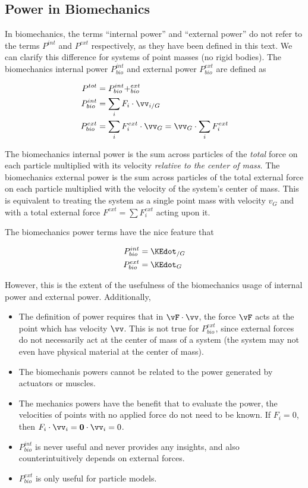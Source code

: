 \subsection*{Power in Biomechanics}
\label{sec:Power in Biomechanics}

In biomechanics, the terms ``internal power'' and ``external power'' do not refer to the terms $P^{int}$ and $P^{ext}$ respectively, as they have been defined in this text. We can clarify this difference for systems of point masses (no rigid bodies). The biomechanics internal power $P_{bio}^{int}$ and external power $P_{bio}^{ext}$ are defined as

\begin{align}
P^{tot} &= P_{bio}^{int} + _{bio}^{ext} \\
P_{bio}^{int} &= \sum_{i} F_{i} \cdot \vv_{i/G} \\
P_{bio}^{ext} &= \sum_{i} F_{i}^{ext} \cdot \vv_{G} = \vv_{G} \cdot \sum_{i} F_{i}^{ext}
\end{align}

The biomechanics internal power is the sum across particles of the \emph{total} force on each particle multiplied with its velocity \emph{relative to the center of mass}. The biomechanics external power is the sum across particles of the total external force on each particle multiplied with the velocity of the system's center of mass. This is equivalent to treating the system as a single point mass with velocity $v_{G}$ and with a total external force $F^{ext} = \sum F_{i}^{ext}$ acting upon it.

The biomechanics power terms have the nice feature that

\begin{align}
P_{bio}^{int} &= \KEdot_{/G} \label{eq:PbioInt}  \\
P_{bio}^{ext} &= \KEdot_{G}  \label{eq:PbioExt}
\end{align}

However, this is the extent of the usefulness of the biomechanics usage of internal power and external power. Additionally, 

\begin{itemize}
\item The definition of power requires that in $\vF \cdot \vv$, the force $\vF$ acts at the point which has velocity $\vv$. This is not true for $P_{bio}^{ext}$, since external forces do not necessarily act at the center of mass of a system (the system may not even have physical material at the center of mass).
\item The biomechanis powers cannot be related to the power generated by actuators or muscles.
\item The mechanics powers have the benefit that to evaluate the power, the velocities of points with no applied force do not need to be known. If $F_{i} = 0$, then $F_{i}\cdot\vv_{i} = \mathbf{0} \cdot \vv_{i} = 0$.
\item $P_{bio}^{int}$ is never useful and never provides any insights, and also counterintuitively depends on external forces.
\item $P_{bio}^{ext}$ is only useful for particle models.
\end{itemize}


